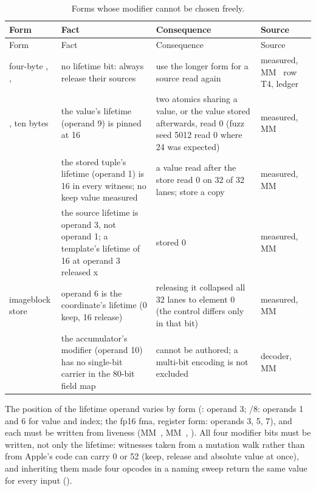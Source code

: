 \begin{xltabular}{\linewidth}{@{}>{\hsize}X>{\hsize}X>{\hsize}X>{\hsize}X@{}}
\caption{Forms whose modifier cannot be chosen freely.}\label{tab:fixed-modifiers}\\
\toprule
Form & Fact & Consequence & Source \\
\midrule
\endfirsthead
{}
\toprule
Form & Fact & Consequence & Source \\
\midrule
\endhead
four-byte , ,  & no lifetime bit: always release their sources & use the longer form for a source read again & measured, MM~ row T4, ledger
 \\*
, ten bytes & the value's lifetime (operand 9) is pinned at 16 & two atomics sharing a value, or the value stored afterwards, read 0
(fuzz seed 5012 read 0 where 24 was expected) & measured, MM~ \\*
 & the stored tuple's lifetime (operand 1) is 16 in every
witness; no keep value measured & a value read after the store read 0 on 32 of 32 lanes; store a copy & measured, MM~ \\*
 & the source lifetime is operand 3, not operand 1; a
template's lifetime of 16 at operand 3 released x &  stored 0 & measured, MM~ \\*
imageblock store & operand 6 is the coordinate's lifetime (0 keep, 16
release) & releasing it collapsed all 32 lanes to element 0 (the control differs only in that bit) & measured, MM~ \\*
 & the accumulator's modifier (operand 10) has no
single-bit carrier in the 80-bit field map & cannot be authored; a multi-bit encoding is not excluded & decoder, MM~ \\*
\bottomrule
\end{xltabular}

The position of the lifetime operand varies by form (: operand 3; /8: operands 1 and 6 for value and index; the fp16 fma, register form: operands 3, 5, 7), and each must be
written from liveness (MM~, MM~, ). All four modifier bits must be written, not only the
lifetime: witnesses taken from a mutation walk rather than from Apple's code can carry 0 or 52 (keep, release and
absolute value at once), and inheriting them made four opcodes in a naming sweep return the same value for every input
().

